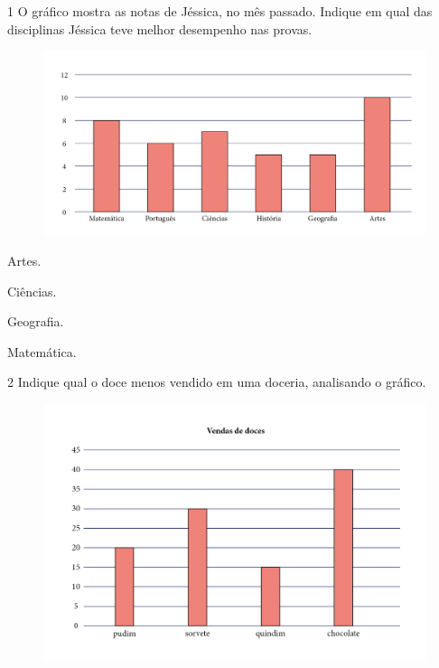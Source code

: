 \num{1} O gráfico mostra as notas de Jéssica, no mês passado. Indique em
qual das disciplinas Jéssica teve melhor desempenho nas provas.

\begin{figure}[htpb!]
\includegraphics[width=\textwidth]{./media/image100.png}
\end{figure}

\begin{escolha}[itemsep=-5pt]
\item Artes.

\item Ciências.

\item Geografia.

\item Matemática.
\end{escolha}

\num{2} Indique qual o doce menos vendido em uma doceria, analisando o gráfico.

\begin{figure}[htpb!]
\includegraphics[width=\textwidth]{./media/image101.png}
\end{figure}

